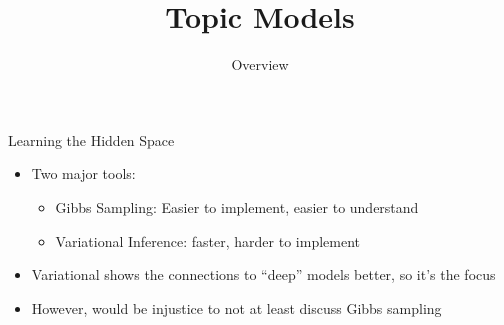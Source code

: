 \documentclass[compress]{beamer}
\title{Topic Models}
\date{Overview}
\begin{document}
\frame{\titlepage
}

\begin{frame}{Learning the Hidden Space}

  \begin{itemize}
    \item Two major tools:
      \begin{itemize}
        \item Gibbs Sampling: Easier to implement, easier to understand
        \item Variational Inference: faster, harder to implement
      \end{itemize}
    \item Variational shows the connections to ``deep'' models better, so it's the focus
    \item However, would be injustice to not at least discuss Gibbs sampling
  \end{itemize}

\end{frame}

%


\begin{frame}

\tiny

\end{frame}
\end{document}
